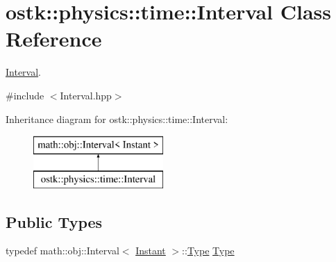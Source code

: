\hypertarget{classostk_1_1physics_1_1time_1_1_interval}{}\section{ostk\+:\+:physics\+:\+:time\+:\+:Interval Class Reference}
\label{classostk_1_1physics_1_1time_1_1_interval}


\hyperlink{classostk_1_1physics_1_1time_1_1_interval}{Interval}.  




{\ttfamily \#include $<$Interval.\+hpp$>$}

Inheritance diagram for ostk\+:\+:physics\+:\+:time\+:\+:Interval\+:\begin{figure}[H]
\begin{center}
\leavevmode
\includegraphics[height=2.000000cm]{classostk_1_1physics_1_1time_1_1_interval}
\end{center}
\end{figure}
\subsection*{Public Types}
\begin{DoxyCompactItemize}
\item 
typedef math\+::obj\+::\+Interval$<$ \hyperlink{classostk_1_1physics_1_1time_1_1_instant}{Instant} $>$\+::\hyperlink{classostk_1_1physics_1_1time_1_1_interval_a7011137ee6d84ebb8705c95d88f87818}{Type} \hyperlink{classostk_1_1physics_1_1time_1_1_interval_a7011137ee6d84ebb8705c95d88f87818}{Type}
\end{DoxyCompactItemize}
